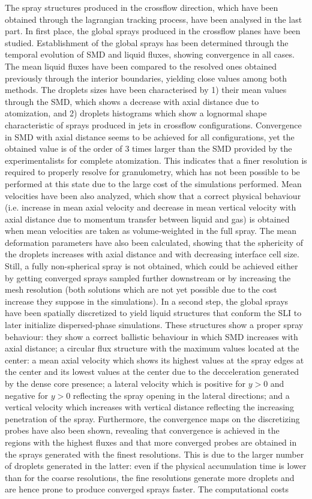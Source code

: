 The spray structures produced in the crossflow direction, which have been obtained through the lagrangian tracking process, have been analysed in the last part. In first place, the global sprays produced in the crossflow planes have been studied. Establishment of the global sprays has been determined through the temporal evolution of SMD and liquid fluxes, showing convergence in all cases. The mean liquid fluxes have been compared to the resolved ones obtained previously through the interior boundaries, yielding close values among both methods. The droplets sizes have been characterised by 1) their mean values through the SMD, which shows a decrease with axial distance due to atomization, and 2) droplets histograms which show a lognormal shape characteristic of sprays produced in jets in crossflow configurations. Convergence in SMD with axial distance seems to be achieved for all configurations, yet the obtained value is of the order of 3 times larger than the SMD provided by the experimentalists for complete atomization. This indicates that a finer resolution is required to properly resolve for granulometry, which has not been possible to be performed at this state due to the large cost of the simulations performed. Mean velocities have been also analyzed, which show that a correct physical behaviour (i.e. increase in mean axial velocity and decrease in mean vertical velocity with axial distance due to momentum transfer between liquid and gas) is obtained when mean velocities are taken as volume-weighted in the full spray. The mean deformation parameters have also been calculated, showing that the sphericity of the droplets increases with axial distance and with decreasing interface cell size. Still, a fully non-spherical spray is not obtained, which could be achieved either by getting converged sprays sampled further downstream or by increasing the mesh resolution (both solutions which are not yet possible due to the cost increase they suppose in the simulations). In a second step, the global sprays have been spatially discretized to yield liquid structures that conform the SLI to later initialize dispersed-phase simulations. These structures show a proper spray behaviour: they show a correct ballistic behaviour in which SMD increases with axial distance; a circular flux structure with the maximum values located at the center: a mean axial velocity which shows its highest values at the spray edges at the center and its lowest values at the center due to the decceleration generated by the dense core presence; a lateral velocity which is positive for $y > 0$ and negative for  $y > 0$ reflecting the spray opening in the lateral directions; and a vertical velocity which increases with vertical distance reflecting the increasing penetration of the spray. Furthermore, the convergence maps on the discretizing probes have also been shown, revealing that convergence is achieved in the regions with the highest fluxes and that more converged probes are obtained in the sprays generated with the finest resolutions. This is due to the larger number of droplets generated in the latter: even if the physical accumulation time is lower than for the coarse resolutions, the fine resolutions generate more droplets and are hence prone to produce converged sprays faster. The computational costs 